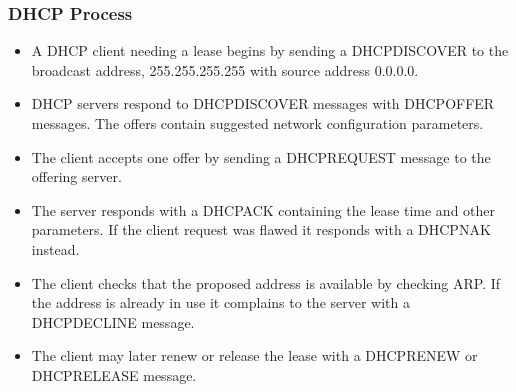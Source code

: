 \documentclass[10pt]{beamer}
\begin{document}
\begin{frame}
  \frametitle{DHCP Process}
  \begin{itemize}
    \item A DHCP client needing a lease begins by sending a DHCPDISCOVER to 
          the broadcast address, 255.255.255.255 with source address 0.0.0.0.
    \item DHCP servers respond to DHCPDISCOVER messages with DHCPOFFER messages. The offers contain suggested network configuration parameters.
    \item The client accepts one offer by sending a DHCPREQUEST message to 
          the offering server.
    \item The server responds with a DHCPACK containing the lease time and other parameters.  If the client request was flawed it responds with a DHCPNAK instead.
    \item The client checks that the proposed address is available by checking ARP.  If the address is already in use it complains to the server with a DHCPDECLINE message.
    \item The client may later renew or release the lease with a DHCPRENEW or DHCPRELEASE message.
  \end{itemize}  
\end{frame}
\end{document}

